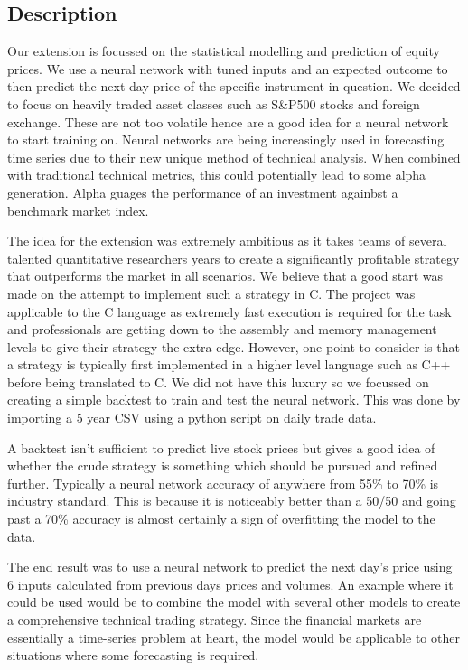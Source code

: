 \documentclass[11pt]{article}
\begin{document}
\subsection{Description}
Our extension is focussed on the statistical modelling and prediction of equity prices. We use a neural network with tuned inputs and an expected outcome to then predict the next day price of the specific instrument in question. We decided to focus on heavily traded asset classes such as S\&P500 stocks and foreign exchange. These are not too volatile hence are a good idea for a neural network to start training on. Neural networks are being increasingly used in forecasting time series due to their new unique method of technical analysis. When combined with traditional technical metrics, this could potentially lead to some alpha generation. Alpha guages the performance of an investment againbst a benchmark market index. 

The idea for the extension was extremely ambitious as it takes teams of several talented quantitative researchers years to create a significantly profitable strategy that outperforms the market in all scenarios. We believe that a good start was made on the attempt to implement such a strategy in C. The project was applicable to the C language as extremely fast execution is required for the task and professionals are getting down to the assembly and memory management levels to give their strategy the extra edge. However, one point to consider is that a strategy is typically first implemented in a higher level language such as C++ before being translated to C. We did not have this luxury so we focussed on creating a simple backtest to train and test the neural network. This was done by importing a 5 year CSV using a python script on daily trade data. 

A backtest isn't sufficient to predict live stock prices but gives a good idea of whether the crude strategy is something which should be pursued and refined further. Typically a neural network accuracy of anywhere from 55\% to 70\% is industry standard. This is because it is noticeably better than a 50/50 and going past a 70\% accuracy is almost certainly a sign of overfitting the model to the data. 

The end result was to use a neural network to predict the next day's price using 6 inputs calculated from previous days prices and volumes. An example where it could be used would be to combine the model with several other models to create a comprehensive technical trading strategy. Since the financial markets are essentially a time-series problem at heart, the model would be applicable to other situations where some forecasting is required. 
\end{document}
